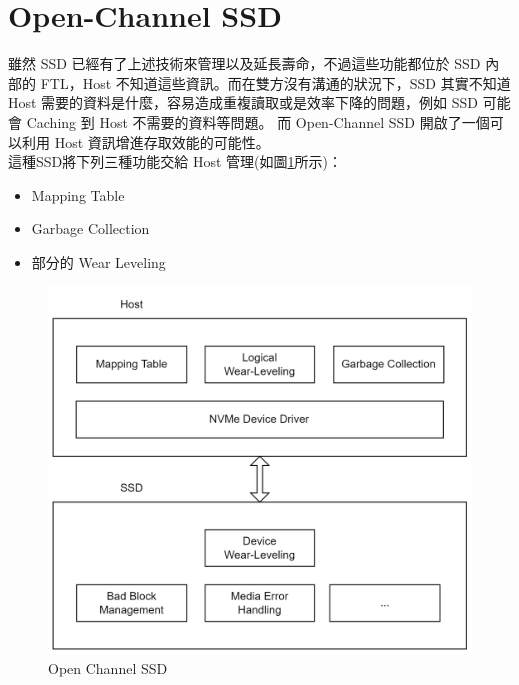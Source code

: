 \section{Open-Channel SSD}\label{s2.3}
\indent
雖然 SSD 已經有了上述技術來管理以及延長壽命，不過這些功能都位於 SSD 內部的 FTL，Host 不知道這些資訊。而在雙方沒有溝通的狀況下，SSD 其實不知道 Host 需要的資料是什麼，容易造成重複讀取或是效率下降的問題，例如 SSD 可能會 Caching 到 Host 不需要的資料等問題。
而 Open-Channel SSD 開啟了一個可以利用 Host 資訊增進存取效能的可能性。\\
這種SSD將下列三種功能交給 Host 管理(如圖\ref{f2.8}所示)：
\begin{itemize}
    \item Mapping Table
    \item Garbage Collection
    \item 部分的 Wear Leveling
\end{itemize}
\begin{figure}[H]
    \centering
    \includegraphics[width=1\textwidth]{picture/ch2/OPSSD.png}
    \caption{Open Channel SSD\cite{OPSSD}}
    \label{f2.8}
\end{figure}

